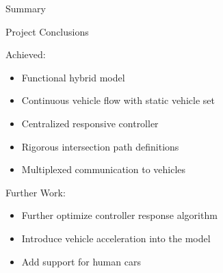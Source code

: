 \documentclass{beamer}
\begin{document}
\begin{frame}{Summary}

\begin{block}{Project Conclusions}
\begin{minipage}{0.45\linewidth}
Achieved:
\begin{itemize}
\item Functional hybrid model 
\item Continuous vehicle flow with static vehicle set
\item Centralized responsive controller
\item Rigorous intersection path definitions
\item Multiplexed communication to vehicles
\end{itemize}
\end{minipage}
\hfill
\begin{minipage}{0.45\linewidth}
Further Work:
\begin{itemize}
\item Further optimize controller response algorithm
\item Introduce vehicle acceleration into the model
\item Add support for human cars
\end{itemize}
\end{minipage}
\end{block}
\end{frame}
\end{document}

